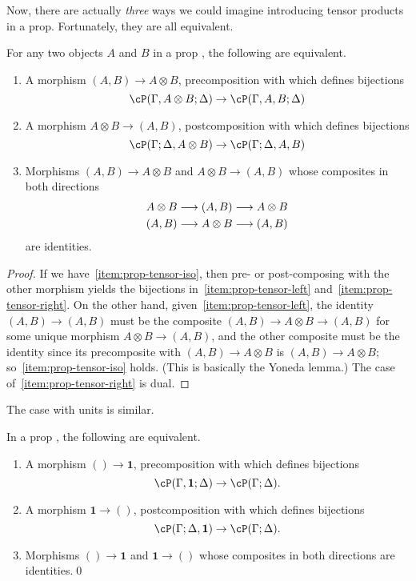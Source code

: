 \documentclass{book}
\def\one{\mathbf{1}}
\let\tensor\otimes
\begin{document}
Now, there are actually \emph{three} ways we could imagine introducing tensor products in a prop.
Fortunately, they are all equivalent.

\begin{lem}\label{thm:prop-tensor}
  For any two objects $A$ and $B$ in a prop \cP, the following are equivalent.
  \begin{enumerate}
  \item A morphism $(A,B) \to A\tensor B$, precomposition with which defines bijections\label{item:prop-tensor-left}
    \[ \cP(\Gamma,A\tensor B;\Delta) \to \cP(\Gamma,A,B;\Delta) \]
  \item A morphism $A\tensor B \to (A,B)$, postcomposition with which defines bijections\label{item:prop-tensor-right}
    \[ \cP(\Gamma;\Delta,A\tensor B) \to \cP(\Gamma;\Delta,A,B) \]
  \item Morphisms $(A,B) \to A\tensor B$ and $A\tensor B \to (A,B)$ whose composites in both directions
    \begin{gather*}
      A\tensor B \too (A,B)  \too A\tensor B\\
      (A,B)\too A\tensor B \too (A,B)
    \end{gather*}
    are identities.\label{item:prop-tensor-iso}
  \end{enumerate}
\end{lem}
\begin{proof}
  If we have~\ref{item:prop-tensor-iso}, then pre- or post-composing with the other morphism yields the bijections in~\ref{item:prop-tensor-left} and~\ref{item:prop-tensor-right}.
  On the other hand, given~\ref{item:prop-tensor-left}, the identity $(A,B)\to (A,B)$ must be the composite $(A,B)\to A\tensor B \to (A,B)$ for some unique morphism $A\tensor B \to (A,B)$, and the other composite must be the identity since its precomposite with $(A,B)\to A\tensor B$ is $(A,B)\to A\tensor B$; so~\ref{item:prop-tensor-iso} holds.
  (This is basically the Yoneda lemma.)
  The case of~\ref{item:prop-tensor-right} is dual.
\end{proof}

The case with units is similar.

\begin{lem}\label{thm:prop-unit}
  In a prop \cP, the following are equivalent.
  \begin{enumerate}
  \item A morphism $()\to \one$, precomposition with which defines bijections
    \[\cP(\Gamma,\one;\Delta) \to \cP(\Gamma;\Delta).\]
  \item A morphism $\one\to()$, postcomposition with which defines bijections
    \[\cP(\Gamma;\Delta,\one) \to \cP(\Gamma;\Delta).\]
  \item Morphisms $()\to \one$ and $\one\to()$ whose composites in both directions are identities.\qed
  \end{enumerate}
\end{lem}
\end{document}
